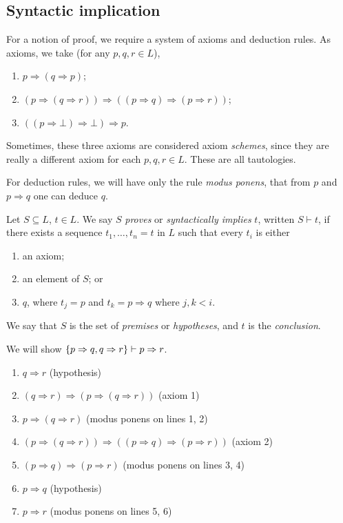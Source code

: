 \subsection{Syntactic implication}
For a notion of proof, we require a system of axioms and deduction rules.
As axioms, we take (for any \( p, q, r \in L \)),
\begin{enumerate}
    \item \( p \Rightarrow (q \Rightarrow p) \);
    \item \( (p \Rightarrow (q \Rightarrow r)) \Rightarrow ((p \Rightarrow q) \Rightarrow (p \Rightarrow r)) \);
    \item \( ((p \Rightarrow \bot) \Rightarrow \bot) \Rightarrow p \).
\end{enumerate}
\begin{remark}
    Sometimes, these three axioms are considered axiom \emph{schemes}, since they are really a different axiom for each \( p, q, r \in L \).
    These are all tautologies.
\end{remark}
For deduction rules, we will have only the rule \emph{modus ponens}, that from \( p \) and \( p \Rightarrow q \) one can deduce \( q \).
\begin{definition}
    Let \( S \subseteq L \), \( t \in L \).
    We say \( S \) \emph{proves} or \emph{syntactically implies} \( t \), written \( S \vdash t \), if there exists a sequence \( t_1, \dots, t_n = t \) in \( L \) such that every \( t_i \) is either
    \begin{enumerate}
        \item an axiom;
        \item an element of \( S \); or
        \item \( q \), where \( t_j = p \) and \( t_k = p \Rightarrow q \) where \( j, k < i \).
    \end{enumerate}
    We say that \( S \) is the set of \emph{premises} or \emph{hypotheses}, and \( t \) is the \emph{conclusion}.
\end{definition}
\begin{example}
    We will show \( \qty{p \Rightarrow q, q \Rightarrow r} \vdash p \Rightarrow r \).
    \begin{enumerate}[1.]
        \item \( q \Rightarrow r \) (hypothesis)
        \item \( (q \Rightarrow r) \Rightarrow (p \Rightarrow (q \Rightarrow r)) \) (axiom 1)
        \item \( p \Rightarrow (q \Rightarrow r) \) (modus ponens on lines 1, 2)
        \item \( (p \Rightarrow (q \Rightarrow r)) \Rightarrow ((p \Rightarrow q) \Rightarrow (p \Rightarrow r)) \) (axiom 2)
        \item \( (p \Rightarrow q) \Rightarrow (p \Rightarrow r) \) (modus ponens on lines 3, 4)
        \item \( p \Rightarrow q \) (hypothesis)
        \item \( p \Rightarrow r \) (modus ponens on lines 5, 6)
    \end{enumerate}
\end{example}
